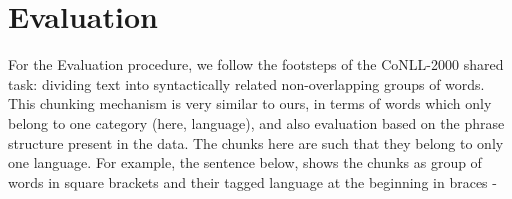 \documentclass[11pt]{article}
\begin{document}
\begin{figure}

\end{figure}



%
%


\section{Evaluation}
For the Evaluation procedure, we follow the footsteps of the CoNLL-2000 shared task: dividing text into syntactically related non-overlapping groups of words. This chunking mechanism \cite{tjong2003introduction} is very similar to ours, in terms of words which only belong to one category (here, language), and also evaluation based on the phrase structure present in the data. The chunks here are such that they belong to only one language. For example, the sentence below, shows the chunks as group of words in square brackets and their tagged language at the beginning in braces - \\
\end{document}
